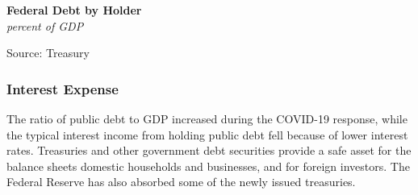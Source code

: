 \documentclass{report}
\makeatletter
\newcommand{\tbllink}[1]{\href{https://raw.githubusercontent.com/bdecon/US-chartbook/master/chartbook/data/#1}{\faTable}}
\newcommand*\short[1]{\expandafter\@gobbletwo\number\numexpr#1\relax}
\newcommand{\sbar}[4]{
		\addplot[ybar stacked, bar width=2.3pt, draw opacity=0, fill=#1] 
			table [x=#2, y=#3, col sep=comma]{#4};}
\newcommand{\dateaxisticks}{
		date coordinates in=x, axis line style={draw=none},
		xmax={2024-01-31},
		max space between ticks=40,	    
		xtick={{1990-01-01}, {1992-01-01}, {1994-01-01}, 
			{1996-01-01}, {1998-01-01}, {2000-01-01}, 
			{2002-01-01}, {2004-01-01}, {2006-01-01},
			{2008-01-01}, {2010-01-01}, {2012-01-01}, {2014-01-01},
		    {2016-01-01}, {2018-01-01}, {2020-01-01}, {2022-01-01}, 
		    {2024-01-01}, {2026-01-01}},
		minor xtick={{1989-01-01}, {1991-01-01}, {1993-01-01},
			{1995-01-01}, {1997-01-01}, {1999-01-01}, 
			{2001-01-01}, {2003-01-01}, {2005-01-01}, {2007-01-01},
		    {2009-01-01}, {2011-01-01}, {2013-01-01}, {2015-01-01},
		    {2017-01-01}, {2019-01-01}, {2021-01-01}, {2023-01-01}, 
		    {2025-01-01}, {2027-01-01}},
		enlarge y limits={0.06}, enlarge x limits={0.01},
		xticklabel style={align=center, yshift=-2pt}, tick label style={inner sep=0pt},
		}
\newcommand{\bbar}[2]{extra #1 ticks = {{#2}}, extra #1 tick labels = ,
		extra #1 tick style = {grid=major, grid style={thick, black!25}},}
\newcommand{\rbars}{
		\fill[color=black!10] (axis cs:{1990-07-01},\pgfkeysvalueof{/pgfplots/ymin})
			rectangle (axis cs:{1991-03-01}, \pgfkeysvalueof{/pgfplots/ymax});
		\fill[color=black!10] (axis cs:{2007-12-01},\pgfkeysvalueof{/pgfplots/ymin})
			rectangle (axis cs:{2009-07-01}, \pgfkeysvalueof{/pgfplots/ymax});
		\fill[color=black!10] (axis cs:{2001-03-01},\pgfkeysvalueof{/pgfplots/ymin})
			rectangle (axis cs:{2001-11-01}, \pgfkeysvalueof{/pgfplots/ymax});
		\fill[color=black!10] (axis cs:{2020-02-01},\pgfkeysvalueof{/pgfplots/ymin})
			rectangle (axis cs:{2020-05-01}, \pgfkeysvalueof{/pgfplots/ymax});}
\makeatother
\begin{document}
{\begin{minipage}{1.0\textwidth}

\vspace{1mm}

\normalsize \textbf{Federal Debt by Holder}\\
\footnotesize{\textit{percent of GDP}}
\vspace{3.0cm}

\hspace{4mm} 

\footnotesize{Source: Treasury} \hfill \tbllink{pubdebt.csv}
\vspace{3mm}

\subsubsection*{Interest Expense}
\small The ratio of public debt to GDP increased during the COVID-19 response, while the typical interest income from holding public debt fell because of lower interest rates. Treasuries and other government debt securities provide a safe asset for the balance sheets domestic households and businesses, and for foreign investors. The Federal Reserve has also absorbed some of the newly issued treasuries. 
\end{minipage}
\vspace{1mm}

}
\end{document}
